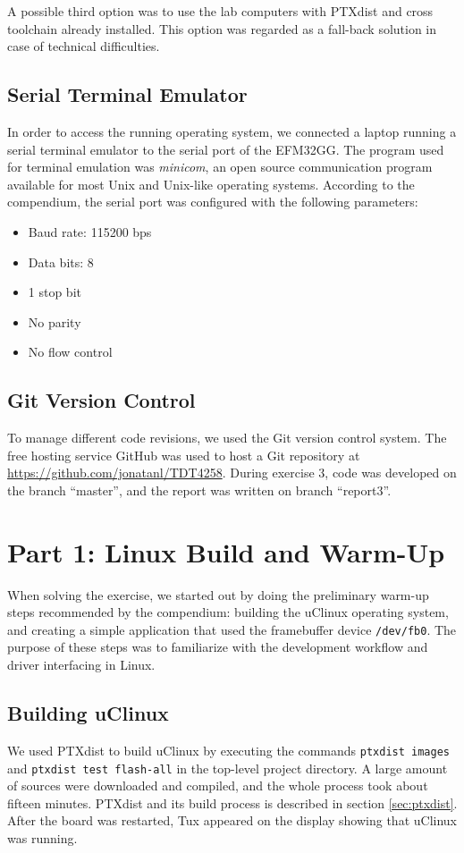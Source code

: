 A possible third option was to use the lab computers with PTXdist and cross toolchain already installed. This option was regarded as a fall-back solution in case of technical difficulties.

\subsection{Serial Terminal Emulator}\label{sec:serial-terminal-emulator}
In order to access the running operating system, we connected a laptop running a serial terminal emulator to the serial port of the EFM32GG. The program used for terminal emulation was \emph{minicom}, an open source communication program available for most Unix and Unix-like operating systems.\cite{minicom-man-page} According to the compendium, the serial port was configured with the following parameters:
\begin{itemize}
  \item Baud rate: 115200 bps
  \item Data bits: 8
  \item 1 stop bit
  \item No parity
  \item No flow control
\end{itemize}

\subsection{Git Version Control}
To manage different code revisions, we used the Git version control system. The free hosting service GitHub was used to host a Git repository at \url{https://github.com/jonatanl/TDT4258}. During exercise 3, code was developed on the branch ``master'', and the report was written on branch ``report3''.


\section{Part 1: Linux Build and Warm-Up}
When solving the exercise, we started out by doing the preliminary warm-up steps recommended by the compendium: building the uClinux operating system, and creating a simple application that used the framebuffer device \texttt{/dev/fb0}. The purpose of these steps was to familiarize with the development workflow and driver interfacing in Linux.

\subsection{Building uClinux}
We used PTXdist to build uClinux by executing the commands \texttt{ptxdist images} and \texttt{ptxdist test flash-all} in the top-level project directory. A large amount of sources were downloaded and compiled, and the whole process took about fifteen minutes. PTXdist and its build process is described in section \ref{sec:ptxdist}. After the board was restarted, Tux appeared on the display showing that uClinux was running.

